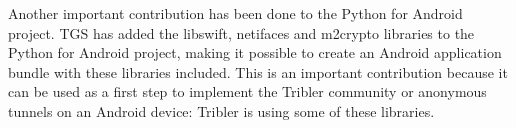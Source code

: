		Another important contribution has been done to the Python for Android project. TGS has added the libswift, netifaces and m2crypto libraries to the Python for Android project, making it possible to create an Android application bundle with these libraries included. This is an important contribution because it can be used as a first step to implement the Tribler community or anonymous tunnels on an Android device: Tribler is using some of these libraries.

